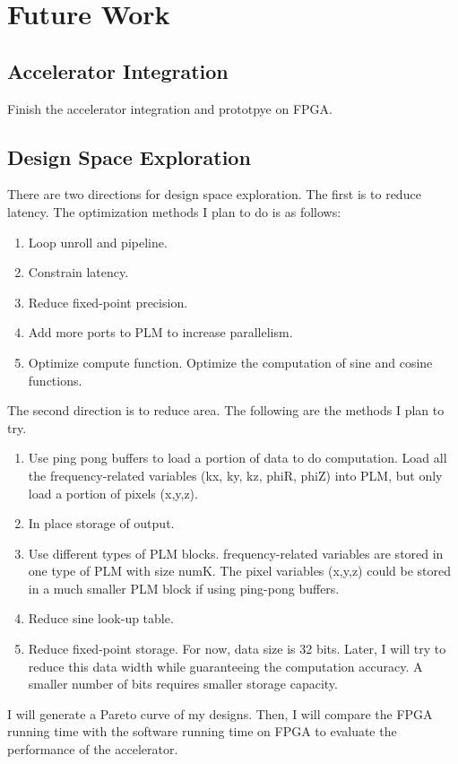 \section{Future Work}

\subsection{Accelerator Integration}

Finish the accelerator integration and prototpye on FPGA.

\subsection{Design Space Exploration}

There are two directions for design space exploration. The first is to reduce
 latency. The optimization methods I plan to do is as follows:

\begin{enumerate}

\item Loop unroll and pipeline.

\item Constrain latency.

\item Reduce fixed-point precision.

\item Add more ports to PLM to increase parallelism.

\item Optimize compute function. Optimize the computation of sine and cosine functions.

\end{enumerate}

The second direction is to reduce area. The following are the methods I plan to try.

\begin{enumerate}

    \item Use ping pong buffers to load a portion of data to do computation. 
      Load all the frequency-related variables (kx, ky, kz, phiR, phiZ) into PLM,
      but only load a portion of pixels (x,y,z). 

    \item In place storage of output. 

    \item Use different types of PLM blocks. frequency-related variables are 
      stored in one type of PLM with size numK. The pixel variables (x,y,z) 
      could be stored in a much smaller PLM block if using ping-pong buffers. 

    \item Reduce sine look-up table.  

    \item Reduce fixed-point storage. For now, data size is 32 bits. Later, I 
      will try to reduce this data width while guaranteeing the computation 
      accuracy. A smaller number of bits requires smaller storage capacity.

\end{enumerate}

I will generate a Pareto curve of my designs. Then, I will compare the FPGA 
running time with the software running time on FPGA to evaluate the performance 
of the accelerator.
